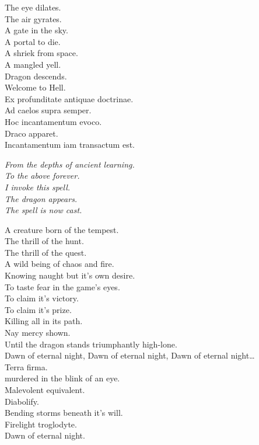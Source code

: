 The eye dilates. \\
The air gyrates. \\
A gate in the sky. \\
A portal to die. \\
A shriek from space. \\
A mangled yell. \\
Dragon descends. \\
Welcome to Hell. \\

Ex profunditate antiquae doctrinae. \\
Ad caelos supra semper. \\
Hoc incantamentum evoco. \\
Draco apparet. \\
Incantamentum iam transactum est. \\


{\itshape%
From the depths of ancient learning. \\
To the  above forever. \\
I invoke this spell. \\
The dragon appears. \\
The spell is now cast. \\
}

A creature born of the tempest. \\
The thrill of the hunt. \\
The thrill of the quest. \\
A wild being of chaos and fire. \\
Knowing naught but it's own desire. \\
To taste fear in the game's eyes. \\
To claim it's victory. \\
To claim it's prize. \\
Killing all in its path. \\
Nay mercy shown. \\
Until the dragon stands triumphantly high-lone. \\

Dawn of eternal night, Dawn of eternal night, Dawn of eternal night… \\

Terra firma. \\
 murdered in the blink of an eye. \\
Malevolent equivalent. \\
Diabolify. \\
Bending storms beneath it's will. \\
Firelight troglodyte. \\
Dawn of eternal night. \\

